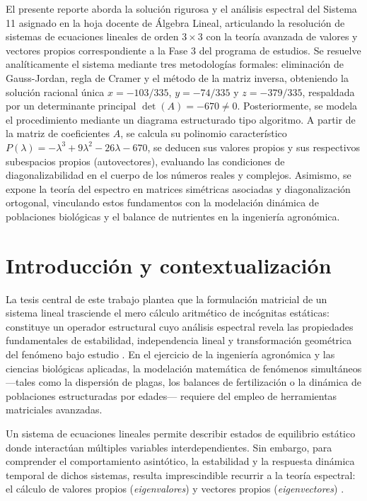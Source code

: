 \documentclass[spanish,letterpaper,oneside]{article}
\begin{document}
\templatePortrait
\templatePagecfg
\onehalfspacing

\begin{abstractd}
El presente reporte aborda la solución rigurosa y el análisis espectral del Sistema 11 asignado en la hoja docente de Álgebra Lineal, articulando la resolución de sistemas de ecuaciones lineales de orden $3 \times 3$ con la teoría avanzada de valores y vectores propios correspondiente a la Fase 3 del programa de estudios. Se resuelve analíticamente el sistema mediante tres metodologías formales: eliminación de Gauss-Jordan, regla de Cramer y el método de la matriz inversa, obteniendo la solución racional única $x = -103/335$, $y = -74/335$ y $z = -379/335$, respaldada por un determinante principal $\det(A) = -670 \neq 0$. Posteriormente, se modela el procedimiento mediante un diagrama estructurado tipo algoritmo. A partir de la matriz de coeficientes $A$, se calcula su polinomio característico $P(\lambda) = -\lambda^3 + 9\lambda^2 - 26\lambda - 670$, se deducen sus valores propios y sus respectivos subespacios propios (autovectores), evaluando las condiciones de diagonalizabilidad en el cuerpo de los números reales y complejos. Asimismo, se expone la teoría del espectro en matrices simétricas asociadas y diagonalización ortogonal, vinculando estos fundamentos con la modelación dinámica de poblaciones biológicas y el balance de nutrientes en la ingeniería agronómica.
\end{abstractd}

\templateIndex
\templateFinalcfg

\section{Introducción y contextualización}

La tesis central de este trabajo plantea que la formulación matricial de un sistema lineal trasciende el mero cálculo aritmético de incógnitas estáticas: constituye un operador estructural cuyo análisis espectral revela las propiedades fundamentales de estabilidad, independencia lineal y transformación geométrica del fenómeno bajo estudio \citep{lay2016,caswell2001}. En el ejercicio de la ingeniería agronómica y las ciencias biológicas aplicadas, la modelación matemática de fenómenos simultáneos —tales como la dispersión de plagas, los balances de fertilización o la dinámica de poblaciones estructuradas por edades— requiere del empleo de herramientas matriciales avanzadas. 

Un sistema de ecuaciones lineales permite describir estados de equilibrio estático donde interactúan múltiples variables interdependientes. Sin embargo, para comprender el comportamiento asintótico, la estabilidad y la respuesta dinámica temporal de dichos sistemas, resulta imprescindible recurrir a la teoría espectral: el cálculo de valores propios (\emph{eigenvalores}) y vectores propios (\emph{eigenvectores}) \citep{anton2014,strang2016}. 
\end{document}
